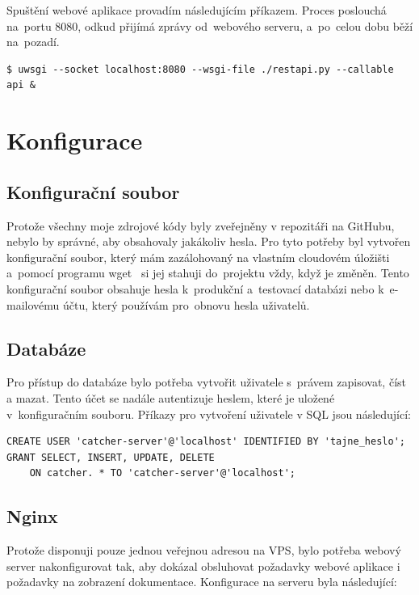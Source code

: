 Spuštění webové aplikace provadím následujícím příkazem. Proces poslouchá na~portu 8080, odkud přijímá zprávy od~webového serveru, a~po~celou dobu běží na~pozadí.

\begingroup
\fontsize{9.5pt}{11pt}\selectfont
\begin{verbatim}
$ uwsgi --socket localhost:8080 --wsgi-file ./restapi.py --callable api &
\end{verbatim}
\endgroup

\section{Konfigurace}

\subsection*{Konfigurační soubor}

Protože všechny moje zdrojové kódy byly zveřejněny v repozitáři na Git\-Hubu, nebylo by správné, aby obsahovaly jakákoliv hesla.
Pro tyto potřeby byl vytvořen konfigurační soubor, který mám zazálohovaný na vlastním cloudovém úložišti
a~pomocí programu wget~\cite{wget} si jej stahuji do~projektu vždy, když je změněn.
Tento konfigurační soubor obsahuje hesla k~produkční a~testovací databázi
nebo k~e-mailovému účtu, který používám pro~obnovu hesla uživatelů.

\subsection*{Databáze}

Pro přístup do databáze bylo potřeba vytvořit uživatele s~právem zapisovat, číst a mazat.
Tento účet se nadále autentizuje heslem, které je uložené v~konfiguračním souboru.
Příkazy pro vytvoření uživatele v SQL jsou následující:

\begingroup
\fontsize{9.5pt}{11pt}\selectfont
\begin{verbatim}
CREATE USER 'catcher-server'@'localhost' IDENTIFIED BY 'tajne_heslo';
GRANT SELECT, INSERT, UPDATE, DELETE
    ON catcher. * TO 'catcher-server'@'localhost';
\end{verbatim}
\endgroup

\subsection*{Nginx}

Protože disponuji pouze jednou veřejnou adresou na VPS, bylo potřeba webový server nakonfigurovat tak,
aby dokázal obsluhovat požadavky webové aplikace i požadavky
na zobrazení dokumentace. Konfigurace na serveru byla následující:

